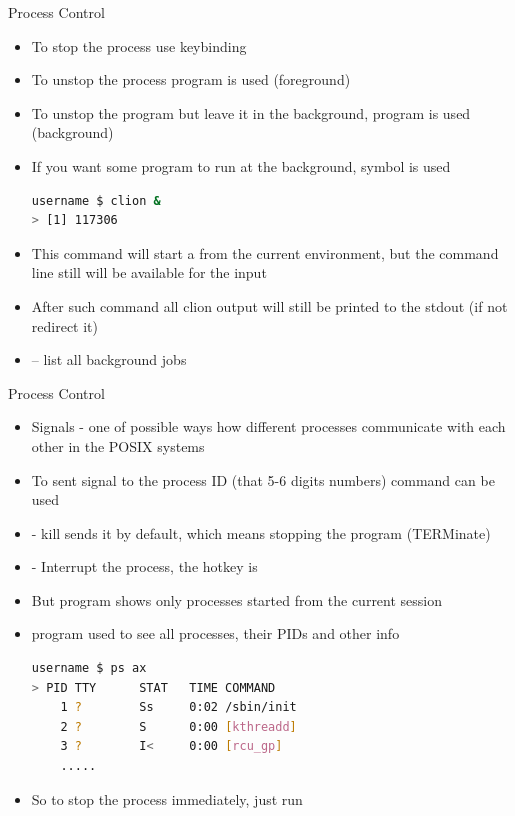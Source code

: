 \documentclass[usenames,dvipsnames,10pt,aspectratio=169]{beamer}
\begin{document}
\begin{frame}[fragile]{Process Control}
    \begin{itemize}
        \item To stop the process use  keybinding
        \item To unstop the process  program is used (foreground)
        \item To unstop the program but leave it in the background,  program is used (background)
        \item If you want some program to run at the background, \ex{\&} symbol is used
        \begin{lstlisting}[language=bash, style=shellstyle]
username $ clion &
> [1] 117306 \end{lstlisting}
        \item This command will start a  from the current environment, but the command line still will be available for the input
        \item {} After such command all clion output will still be printed to the stdout (if not redirect it)
        \item {} -- list all background jobs
    \end{itemize}
\end{frame}

\begin{frame}[fragile]{Process Control}
    \begin{itemize}
        \item Signals - one of possible ways how different processes communicate with each other in the POSIX systems
        \item To sent signal to the process ID (that 5-6 digits numbers)  command can be used
        \item {} - kill sends it by default, which means stopping the program (TERMinate)
        \item {} - Interrupt the process, the hotkey is 
        \item But  program shows only processes started from the current session
        \item {} program used to see all processes, their PIDs and other info
        \begin{lstlisting}[language=bash, style=shellstyle]
username $ ps ax
> PID TTY      STAT   TIME COMMAND
    1 ?        Ss     0:02 /sbin/init     
    2 ?        S      0:00 [kthreadd]
    3 ?        I<     0:00 [rcu_gp]
    .....\end{lstlisting}
        \item So to stop the process immediately, just run 
    \end{itemize}
    
\end{frame}
\end{document}
